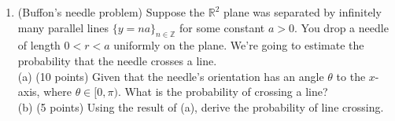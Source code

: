 \documentclass[14pt]{extarticle}
\begin{document}
\begin{enumerate}
    \item (Buffon's needle problem) Suppose the $\mathbb{R}^2$ plane was separated by infinitely many parallel lines $\{y=na\}_{n\in\mathbb{Z}}$ for some constant $a>0$. You drop a needle of length $0<r<a$ uniformly on the plane. We're going to estimate the probability that the needle crosses a line.\\
    (a) (10 points) Given that the needle's orientation has an angle $\theta$ to the $x$-axis, where $\theta\in[0,\pi)$. What is the probability of crossing a line?\\
    (b) (5 points) Using the result of (a), derive the probability of line crossing.

\end{enumerate}
\end{document}
